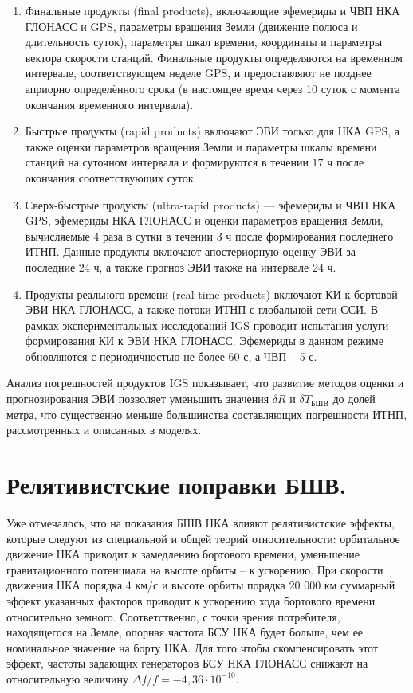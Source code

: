 \documentclass[14pt,a4paper,oneside]{extarticle}
\begin{document}
\begin{enumerate}
    \item Финальные продукты (final products), включающие эфемериды и ЧВП НКА ГЛОНАСС и GPS, параметры вращения Земли (движение полюса и длительность суток), параметры шкал времени, координаты и параметры вектора скорости станций. Финальные продукты определяются на временном интервале, соответствующем неделе GPS, и предоставляют не позднее априорно определённого срока (в настоящее время через 10 суток с момента окончания временного интервала).
    \item Быстрые продукты (rapid products) включают ЭВИ только для НКА GPS, а также оценки параметров вращения Земли и параметры шкалы времени станций на суточном интервала и формируются в течении 17 ч после окончания соответствующих суток.
    \item Сверх-быстрые продукты (ultra-rapid products) –– эфемериды и ЧВП НКА GPS, эфемериды НКА ГЛОНАСС и оценки параметров вращения Земли, вычисляемые 4 раза в сутки в течении 3 ч после формирования последнего ИТНП. Данные продукты включают апостериорную оценку ЭВИ за последние 24 ч, а также прогноз ЭВИ также на интервале 24 ч.
    \item Продукты реального времени (real-time products) включают КИ к бортовой ЭВИ НКА ГЛОНАСС, а также потоки ИТНП с глобальной сети ССИ. В рамках экспериментальных исследований IGS проводит испытания услуги формирования КИ к ЭВИ НКА ГЛОНАСС. Эфемериды в данном режиме обновляются с периодичностью не более 60 с, а ЧВП – 5 с.
\end{enumerate}

Анализ погрешностей продуктов IGS показывает, что развитие методов оценки и прогнозирования ЭВИ позволяет уменьшить значения $\delta R$ и $\delta T_\text{БШВ}$ до долей метра, что существенно меньше большинства составляющих погрешности ИТНП, рассмотренных и описанных в моделях.

\section{Релятивистские поправки БШВ.}

Уже отмечалось, что на показания БШВ НКА влияют релятивистские эффекты, которые следуют из специальной и общей теорий относительности: орбитальное движение НКА приводит к замедлению бортового времени, уменьшение гравитационного потенциала на высоте орбиты – к ускорению. При скорости движения НКА порядка 4 км/с и высоте орбиты порядка 20 000 км суммарный эффект указанных факторов приводит к ускорению хода бортового времени относительно земного. Соответственно, с точки зрения потребителя, находящегося на Земле, опорная частота БСУ НКА будет больше, чем ее номинальное значение на борту НКА. Для того чтобы скомпенсировать этот эффект, частоты задающих генераторов БСУ НКА ГЛОНАСС снижают на относительную величину $\Delta f/f=-4,36\cdot10^{-10}$.
\end{document}
